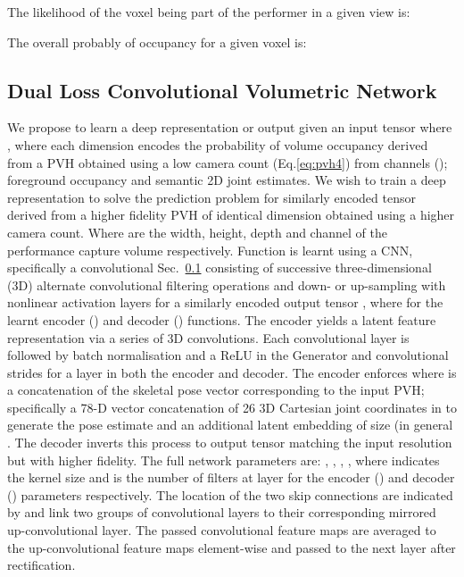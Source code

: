 \documentclass{bmvc2k}
\begin{document}
The likelihood of the voxel being part of the performer in a given view  is: 

The overall probably of occupancy for a given voxel  is:






\subsection{Dual Loss Convolutional Volumetric Network}
\label{sec:autoenc}


We propose to learn a deep representation or output given an input tensor  where , where each dimension encodes the probability of volume occupancy  derived from a PVH obtained using a low camera count (Eq.\ref{eq:pvh4}) from channels (); foreground occupancy  and semantic 2D  joint  estimates.  We wish to train a deep representation to solve the prediction problem  for similarly encoded tensor  derived from a higher fidelity PVH of identical dimension obtained using a  higher camera count. Where  are the width, height, depth and channel of the performance capture volume respectively.  Function  is learnt using a CNN, specifically a convolutional Sec.~\ref{sec:autoenc} consisting of successive three-dimensional (3D) alternate convolutional filtering operations and down- or up-sampling with nonlinear activation layers for a similarly encoded output tensor , where 
for the learnt encoder () and decoder () functions. The encoder yields a latent feature representation via a series of 3D convolutions. Each convolutional layer is followed by batch normalisation and a ReLU in the Generator and convolutional strides for a layer in both the encoder and decoder. The encoder enforces  where  is a concatenation of the skeletal pose vector corresponding to the input PVH; specifically a 78-D vector concatenation of 26 3D Cartesian joint coordinates in  to generate the pose estimate and an additional latent embedding of size  (in general . The decoder  inverts this process to output tensor  matching the input resolution but with higher fidelity. 
The full network parameters are: , , , ,  
where  indicates the kernel size and  is the number of filters at layer  for the encoder () and decoder () parameters respectively. The location of the two skip connections are indicated by  and link two groups of convolutional layers to their corresponding mirrored up-convolutional layer. The passed convolutional feature maps are averaged to the up-convolutional feature maps element-wise and passed to the next layer after rectification.  
\end{document}
